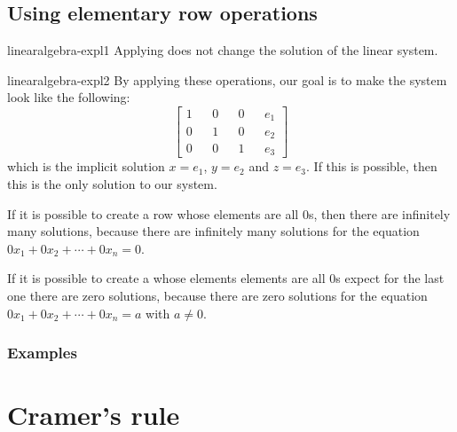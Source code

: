 \documentclass[preview]{standalone}
\begin{document}
\subsection{Using elementary row operations}

\begin{snippet}{linearalgebra-expl1}
    Applying 
    does not change the solution of the linear system.
\end{snippet}


\begin{snippet}{linearalgebra-expl2}
    By applying these operations, our goal is to make the system \matrix
    look like the following:
    \[
        \begin{bmatrix}
            1 && 0 && 0 && e_1 \\
            0 && 1 && 0 && e_2 \\
            0 && 0 && 1 && e_3
        \end{bmatrix}
    \]
    which is the implicit solution
    \(x=e_1\), \(y=e_2\) and \(z=e_3\).
    If this is possible, then this is the only solution to our system.

    \vspace{.25cm}

    If it is possible to create a row whose elements are all \(0\)s,
    then there are infinitely many solutions, because
    there are infinitely many solutions for the equation
    \(0x_1+0x_2+\cdots+0x_n = 0\).

    \vspace{.25cm}

    If it is possible to create a whose elements elements
    are all \(0\)s expect for the last one there are zero solutions,
    because there are zero solutions for the equation
    \(0x_1+0x_2+\cdots+0x_n = a\) with \(a \neq 0\).
\end{snippet}

\subsubsection{Examples}


\section{Cramer's rule}
\end{document}

